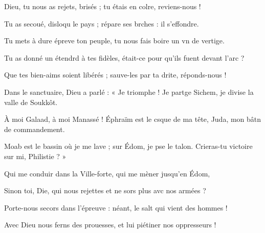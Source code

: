 \item Dieu, tu nous as rejets, brisés ; tu étais en colre, reviens-nous !
\item Tu as secoué, disloqu le pays ; répare ses brches : il s’effondre.
\item Tu mets à dure épreve ton peuple, tu nous fais boire un vn de vertige.
\item Tu as donné un étendrd à tes fidèles, était-ce pour qu’ils fuent devant l’arc ?
\item Que tes bien-aims soient libérés ; sauve-les par ta drite, réponds-nous !
\item Dans le sanctuaire, Dieu a parlé : « Je triomphe ! Je partge Sichem, je divise la valle de Soukkôt.
\item À moi Galaad, à moi Manassé ! Éphraïm est le csque de ma tête, Juda, mon bâtn de commandement.
\item Moab est le bassin où je me lave ; sur Édom, je pse le talon. Crieras-tu victoire sur mi, Philistie ? »
\item Qui me conduir dans la Ville-forte, qui me mèner jusqu’en Édom,
\item Sinon toi, Die, qui nous rejettes et ne sors plus avc nos armées ?
\item Porte-nous secors dans l’épreuve : néant, le salt qui vient des hommes !
\item Avec Dieu nous ferns des prouesses, et lui piétiner nos oppresseurs !